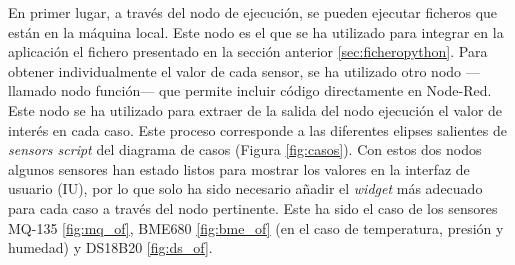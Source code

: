 En primer lugar, a través del nodo de ejecución, se pueden ejecutar ficheros que están en la máquina local. Este nodo es el que se ha utilizado para integrar en la aplicación el fichero presentado en la sección anterior \ref{sec:ficheropython}. Para obtener individualmente el valor de cada sensor, se ha utilizado otro nodo ---llamado nodo función--- que permite incluir código directamente en Node-Red. Este nodo se ha utilizado para extraer de la salida del nodo ejecución el valor de interés en cada caso. Este proceso corresponde a las diferentes elipses salientes de \textit{sensors script} del diagrama de casos (Figura \ref{fig:casos}). Con estos dos nodos algunos sensores han estado listos para mostrar los valores en la interfaz de usuario (IU), por lo que solo ha sido necesario añadir el \textit{widget} más adecuado para cada caso a través del nodo pertinente. Este ha sido el caso de los sensores MQ-135 \ref{fig:mq_of}, BME680 \ref{fig:bme_of} (en el caso de temperatura, presión y humedad) y DS18B20 \ref{fig:ds_of}.\\

